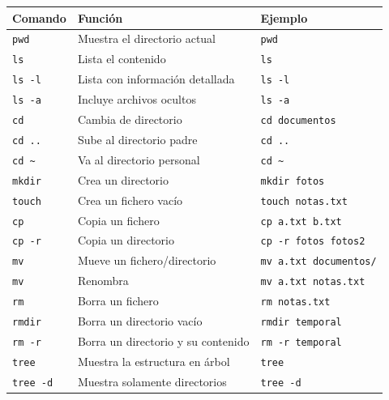 \documentclass[11pt,a4paper]{article}
\begin{document}
\begin{longtable}{p{}p{}p{}}
\toprule
\textbf{Comando} & \textbf{Función} & \textbf{Ejemplo} \\
\midrule
\endhead


\texttt{pwd} &
Muestra el directorio actual &
\texttt{pwd} \\


\texttt{ls} &
Lista el contenido &
\texttt{ls} \\


\texttt{ls -l} &
Lista con información detallada &
\texttt{ls -l} \\


\texttt{ls -a} &
Incluye archivos ocultos &
\texttt{ls -a} \\


\texttt{cd} &
Cambia de directorio &
\texttt{cd documentos} \\


\texttt{cd ..} &
Sube al directorio padre &
\texttt{cd ..} \\


\texttt{cd \textasciitilde} &
Va al directorio personal &
\texttt{cd \textasciitilde} \\


\texttt{mkdir} &
Crea un directorio &
\texttt{mkdir fotos} \\


\texttt{touch} &
Crea un fichero vacío &
\texttt{touch notas.txt} \\


\texttt{cp} &
Copia un fichero &
\texttt{cp a.txt b.txt} \\


\texttt{cp -r} &
Copia un directorio &
\texttt{cp -r fotos fotos2} \\


\texttt{mv} &
Mueve un fichero/directorio &
\texttt{mv a.txt documentos/} \\


\texttt{mv} &
Renombra &
\texttt{mv a.txt notas.txt} \\


\texttt{rm} &
Borra un fichero &
\texttt{rm notas.txt} \\


\texttt{rmdir} &
Borra un directorio vacío &
\texttt{rmdir temporal} \\


\texttt{rm -r} &
Borra un directorio y su contenido &
\texttt{rm -r temporal} \\


\texttt{tree} &
Muestra la estructura en árbol &
\texttt{tree} \\


\texttt{tree -d} &
Muestra solamente directorios &
\texttt{tree -d} \\


\bottomrule
\end{longtable}
\end{document}

